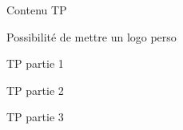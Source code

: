 \begin{TP}
    Contenu TP
    
    Possibilité de mettre un logo perso
    
    TP partie 1
    
    
    TP partie 2
    
    
    TP partie 3 
\end{TP}
